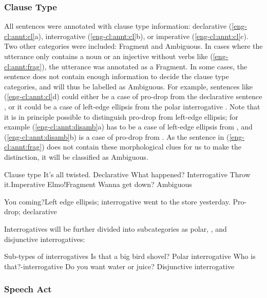 \subsubsection{Clause Type}

All sentences were annotated with clause type information: declarative (\ref{eng-cl:annt:cl}a), interrogative (\ref{eng-cl:annt:cl}b), or imperative (\ref{eng-cl:annt:cl}c). Two other categories were included: Fragment and Ambiguous. In cases where the utterance only contains a noun or an injective without verbs like (\ref{eng-cl:annt:frag}), the utterance was annotated as a Fragment. In some cases, the sentence does not contain enough information to decide the clause type categories, and will thus be labelled as Ambiguous. For example, sentences like (\ref{eng-cl:annt:cl}d) could either be a case of pro-drop from the declarative sentence , or it could be a case of left-edge ellipsis from the polar interrogative . Note that it is in principle possible to distinguish pro-drop from left-edge ellipsis; for example (\ref{eng-cl:annt:disamb}a) has to be a case of left-edge ellipsis from , and (\ref{eng-cl:annt:disamb}b) is a case of pro-drop from . As the sentence in (\ref{eng-cl:annt:frag}) does not contain these morphological clues for us to make the distinction, it will be classified as Ambiguous.

Clause type
\bxl
\label{eng-cl:annt:decl}
It’s all twisted. \hfill Declarative
\ex \label{eng-cl:annt:int} What happened?	\hfill Interrogative
\ex \label{eng-cl:annt:imp} Throw it.\hfill Imperative
\ex \label{eng-cl:annt:frag}	Elmo!\hfill	Fragment
\ex \label{eng-cl:annt:amb} Wanna get down?	\hfill Ambiguous
\exl
\eex

\bxl{} You coming?\hfill Left edge ellipsis; interrogative
\ex went to the store yesterday. \hfill	Pro-drop; declarative
\exl
\eex

Interrogatives will be further divided into subcategories as polar, \twh, and disjunctive interrogatives:

	Sub-types of interrogatives
\bxl{}
Is that a big bird shovel? \hfill	Polar interrogative
\ex	Who is that?\hfill	\twh-interrogative
\ex	Do you want water or juice? \hfill Disjunctive interrogative
\exl
\eex

\subsubsection{Speech Act}

